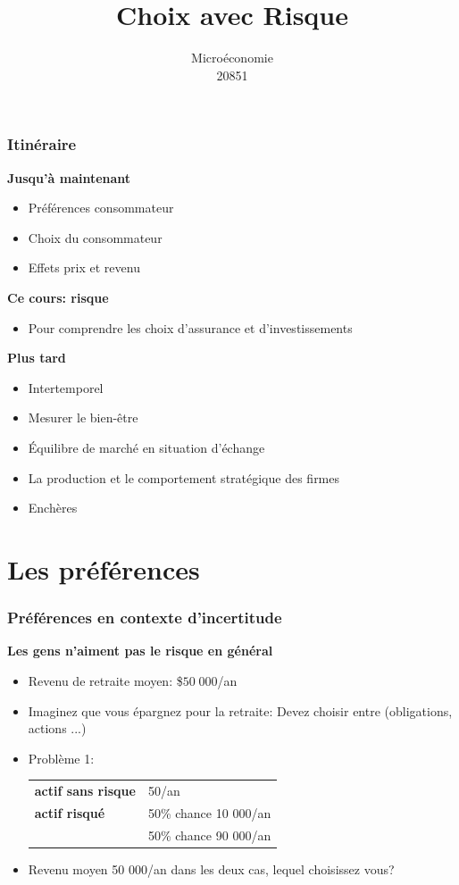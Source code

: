 \documentclass[handout]{beamer}
\title{Choix avec Risque}
\author{Microéconomie \\ 20851}
\date{}
\newenvironment{iPar}[1]{\textbf{#1} \begin{itemize}}{\end{itemize}}
\newcommand{\mdp}{\medskip \pause}
\begin{document}
\frame{\titlepage}

\section[Outline]{}
\frame{\tableofcontents}

\section{}


\begin{frame}\frametitle{Itinéraire}

\begin{iPar}{Jusqu'à maintenant}
\item Préférences consommateur
\item Choix du consommateur
\item Effets prix et revenu
\end{iPar}\mdp

\begin{iPar}{Ce cours: risque}
\item Pour comprendre les choix d'assurance et d'investissements
\end{iPar}\mdp

\begin{iPar}{Plus tard}
\item Intertemporel
\item Mesurer le bien-être
\item  Équilibre de marché en situation d'échange
\item  La production et le comportement stratégique des firmes
\item  Enchères
\end{iPar}
\end{frame}

\section{Les préférences}

\begin{frame}\frametitle{Préférences en contexte d'incertitude}

\begin{iPar}{Les gens n'aiment pas le risque en général}\item Revenu de retraite moyen: \$$50 \; 000$/an \item  Imaginez que vous épargnez pour la retraite:
Devez choisir entre (obligations, actions ...) \item Problème
1: \begin{tabular}{ll} \textbf{actif sans risque} & 50\; 000/an\\
\textbf{actif risqué} & 50\% chance  10 000/an \\ & 50\%  chance  90
000/an\end{tabular} \medskip \item Revenu moyen 50 000/an dans les deux cas, lequel choisissez vous? \end{iPar}

\end{frame}
\end{document}
